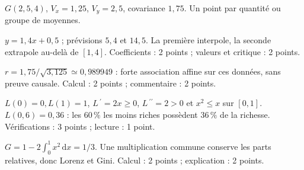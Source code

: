 \begin{questions}
\item $G(2{,}5,4)$, $V_x=1{,}25$, $V_y=2{,}5$, covariance $1{,}75$. Un point par quantité ou groupe de moyennes.
\item $y=1{,}4x+0{,}5$ ; prévisions $5{,}4$ et $14{,}5$. La première interpole, la seconde extrapole au-delà de $[1,4]$. Coefficients : 2 points ; valeurs et critique : 2 points.
\item $r=1{,}75/\sqrt{3{,}125}\simeq0{,}989949$ : forte association affine sur ces données, sans preuve causale. Calcul : 2 points ; commentaire : 2 points.
\item $L(0)=0,L(1)=1$, $L\,\!^{\prime}=2x\geq0$, $L\,\!^{\prime\prime}=2>0$ et $x^2\leq x$ sur $[0,1]$. $L(0{,}6)=0{,}36$ : les $60\,\%$ les moins riches possèdent $36\,\%$ de la richesse. Vérifications : 3 points ; lecture : 1 point.
\item $G=1-2\int_0^1x^2\,\mathrm dx=1/3$. Une multiplication commune conserve les parts relatives, donc Lorenz et Gini. Calcul : 2 points ; explication : 2 points.
\end{questions}

